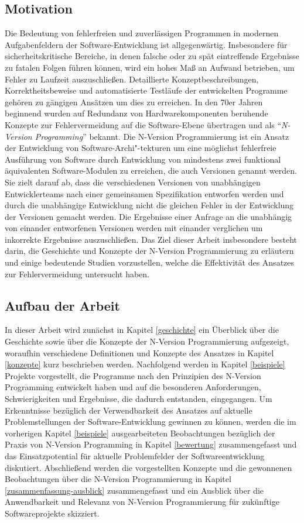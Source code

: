 \subsection{Motivation}\label{motivation}

Die Bedeutung von fehlerfreien und zuverlässigen Programmen in modernen Aufgabenfeldern der Software-Entwicklung ist allgegenwärtig.
Insbesondere für sicherheitskritische Bereiche, in denen falsche oder zu spät eintreffende Ergebnisse zu fatalen Folgen führen können, wird ein hohes Maß an Aufwand betrieben, um Fehler zu Laufzeit auszuschließen.
Detaillierte Konzeptbeschreibungen, Korrektheitsbeweise und automatisierte Testläufe der entwickelten Programme gehören zu gängigen Ansätzen um dies zu erreichen.
In den 70er Jahren beginnend wurden auf Redundanz von Hardwarekomponenten beruhende Konzepte zur Fehlervermeidung auf die Software-Ebene übertragen und als \enquote{\emph{N-Version Programming}} \cite{Chen1978} bekannt.
Die N-Version Programmierung ist ein Ansatz der Entwicklung von Software-Archi"-tekturen um eine möglichst fehlerfreie Ausführung von Software durch Entwicklung von mindestens zwei funktional äquivalenten Software-Modulen zu erreichen, die auch Versionen genannt werden.
Sie zielt darauf ab, dass die verschiedenen Versionen von unabhängigen Entwicklerteams nach einer gemeinsamen Spezifikation entworfen werden und durch die unabhängige Entwicklung nicht die gleichen Fehler in der Entwicklung der Versionen gemacht werden.
Die Ergebnisse einer Anfrage an die unabhängig von einander entworfenen Versionen werden mit einander verglichen um inkorrekte Ergebnisse auszuschließen.
Das Ziel dieser Arbeit insbesondere besteht darin, die Geschichte und Konzepte der N-Version Programmierung zu erläutern und einige bedeutende Studien vorzustellen, welche die Effektivität des Ansatzes zur Fehlervermeidung untersucht haben.


\subsection{Aufbau der Arbeit}\label{aufbau}

In dieser Arbeit wird zunächst in Kapitel \ref{geschichte} ein Überblick über die Geschichte sowie über die Konzepte der N-Version Programmierung aufgezeigt, woraufhin verschiedene Definitionen und Konzepte des Ansatzes in Kapitel \ref{konzepte} kurz beschrieben werden. Nachfolgend werden in Kapitel \ref{beispiele} Projekte vorgestellt, die Programme nach den Prinzipien des N-Version Programming entwickelt haben und auf die besonderen Anforderungen, Schwierigkeiten und Ergebnisse, die dadurch entstanden, eingegangen.
Um Erkenntnisse bezüglich der Verwendbarkeit des Ansatzes auf aktuelle Problemstellungen der Software-Entwicklung gewinnen zu können, werden die im vorherigen Kapitel \ref{beispiele} ausgearbeiteten Beobachtungen bezüglich der Praxis von N-Version Programming in Kapitel \ref{bewertung} zusammengefasst und das Einsatzpotential für aktuelle Problemfelder der Softwareentwicklung diskutiert.
Abschließend werden die vorgestellten Konzepte und die gewonnenen Beobachtungen über die N-Version Programmierung in Kapitel \ref{zusammenfassung-ausblick} zusammengefasst und ein Ausblick über die Anwendbarkeit und Relevanz von N-Version Programmierung für zukünftige Softwareprojekte skizziert.